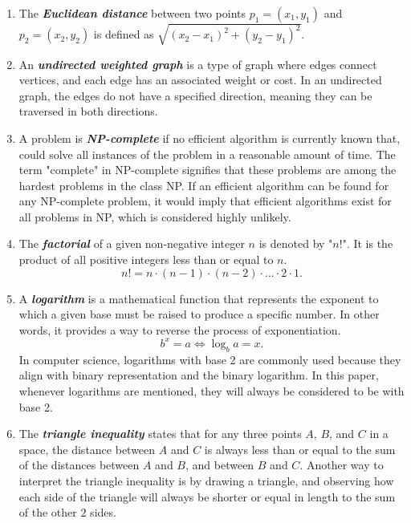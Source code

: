 \documentclass{article}
\begin{document}
\begin{enumerate}   %
 
  \item The \textbf{\textit{Euclidean distance}} between two points $p_1=(x_1,y_1)$ and $p_2=(x_2,y_2)$ is defined as $\sqrt{(x_2-x_1)^2+(y_2-y_1)^2}$. \label{Euclidean distance}
  \item An \textbf{\textit{undirected weighted graph}} is a type of graph where edges connect vertices, and each edge has an associated weight or cost. In an undirected graph, the edges do not have a specified direction, meaning they can be traversed in both directions.\label{undirected weighted graph}
  \item A problem is \textbf{\textit{NP-complete}} if no efficient algorithm is currently known that, could solve all instances of the problem in a reasonable amount of time. The term "complete" in NP-complete signifies that these problems are among the hardest problems in the class NP. If an efficient algorithm can be found for any NP-complete problem, it would imply that efficient algorithms exist for all problems in NP, which is considered highly unlikely. \label{NP-complete}
  \item The \textbf{\textit{factorial}} of a given non-negative integer $n$ is denoted by "$n!$". It is the product of all positive integers less than or equal to $n$.$$n! = n \cdot (n-1) \cdot (n-2) \cdot ... \cdot 2 \cdot 1 .$$\label{factorial}
  \item A \textbf{\textit{logarithm}} is a mathematical function that represents the exponent to which a given base must be raised to produce a specific number. In other words, it provides a way to reverse the process of exponentiation. $$b^x=a \Leftrightarrow \log_b{a}=x.$$ In computer science, logarithms with base 2 are commonly used because they align with binary representation and the binary logarithm.  In this paper, whenever logarithms are mentioned, they will always be considered to be with base 2.\label{logarithm}
  
  \item The \textbf{\textit{triangle inequality}} states that for any three points $A$, $B$, and $C$ in a space, the distance between $A$ and $C$ is always less than or equal to the sum of the distances between $A$ and $B$, and between $B$ and $C$. Another way to interpret the triangle inequality is by drawing a triangle, and observing how each side of the triangle will always be shorter or equal in length to the sum of the other $2$ sides. \label{Triangle Inequality}
  

\end{enumerate}
\end{document}
